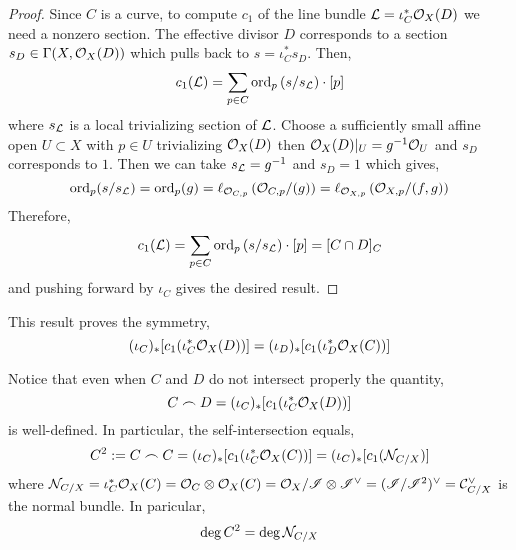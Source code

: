 \documentclass[12pt]{article}
\begin{document}
\begin{proof}
Since $C$ is a curve, to compute $c_1$ of the line bundle $\mathcal{L} = \iota^*_C \mathcal{O}_{X}(D)$ we need a nonzero section. The effective divisor $D$ corresponds to a section $s_D \in \Gamma(X, \mathcal{O}_{X}(D))$ which pulls back to $s = \iota_C^* s_D$. Then,
\[ c_1(\mathcal{L}) = \sum_{p \in C} \mathrm{ord}_{p} \left( s / s_{\mathcal{L}} \right) \cdot [p] \]
where $s_{\mathcal{L}}$ is a local trivializing section of $\mathcal{L}$. Choose a sufficiently small affine open $U \subset X$ with $p \in U$ trivializing $\mathcal{O}_{X}(D)$ then $\mathcal{O}_{X}(D)|_U = g^{-1} \mathcal{O}_{U}$ and $s_D$ corresponds to $1$. Then we can take $s_{\mathcal{L}} = g^{-1}$ and $s_D = 1$ which gives,
\[ \mathrm{ord}_p(s / s_{\mathcal{L}}) = \mathrm{ord}_p(g) = \ell_{\mathcal{O}_{C, p}} \left( \mathcal{O}_{C, p}/(g) \right) = \ell_{\mathcal{O}_{X, p}} \left( \mathcal{O}_{X, p} / (f, g) \right) \]
Therefore,
\[ c_1(\mathcal{L}) = \sum_{p \in C} \mathrm{ord}_{p} \left( s / s_{\mathcal{L}} \right) \cdot [p] = [C \cap D]_C \]
and pushing forward by $\iota_C$ gives the desired result.
\end{proof}

\begin{rmk}
This result proves the symmetry,
\[ (\iota_C)_* [c_1( \iota_C^* \mathcal{O}_{X}(D) )] = (\iota_D)_* [c_1( \iota_D^* \mathcal{O}_{X}(C) )] \]
\end{rmk}

\begin{rmk}
Notice that even when $C$ and $D$ do not intersect properly the quantity,
\[ C \frown D = (\iota_C)_* [c_1(\iota_C^* \mathcal{O}_{X}(D))] \]
is well-defined. In particular, the self-intersection equals,
\[ C^2 := C \frown C = (\iota_C)_* [c_1 (\iota_C^* \mathcal{O}_{X}(C))] = (\iota_C)_* [c_1(\mathcal{N}_{C/X})] \]
where $\mathcal{N}_{C/X} = \iota_C^* \mathcal{O}_{X}(C) = \mathcal{O}_{C} \otimes \mathcal{O}_{X}(C) = \mathcal{O}_{X} / \mathscr{I} \otimes \mathscr{I}^\vee = (\mathscr{I} / \mathscr{I}^2)^\vee = \mathcal{C}_{C/X}^\vee$ is the normal bundle. In paricular,
\[ \deg{C^2} = \deg{\mathcal{N}_{C/X}} \] 
\end{rmk}
\end{document}
